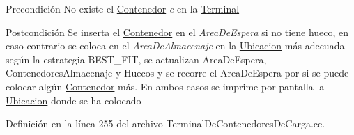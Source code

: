 \begin{DoxyPrecond}{Precondición}
No existe el \hyperlink{class_contenedor}{Contenedor} {\itshape c} en la \hyperlink{class_terminal}{Terminal} 
\end{DoxyPrecond}
\begin{DoxyPostcond}{Postcondición}
Se inserta el \hyperlink{class_contenedor}{Contenedor} en el {\itshape Area\+De\+Espera} si no tiene hueco, en caso contrario se coloca en el {\itshape Area\+De\+Almacenaje} en la \hyperlink{class_ubicacion}{Ubicacion} más adecuada según la estrategia B\+E\+S\+T\+\_\+\+F\+IT, se actualizan Area\+De\+Espera, Contenedores\+Almacenaje y Huecos y se recorre el Area\+De\+Espera por si se puede colocar algún \hyperlink{class_contenedor}{Contenedor} más. En ambos casos se imprime por pantalla la \hyperlink{class_ubicacion}{Ubicacion} donde se ha colocado 
\end{DoxyPostcond}


Definición en la línea 255 del archivo Terminal\+De\+Contenedores\+De\+Carga.\+cc.


